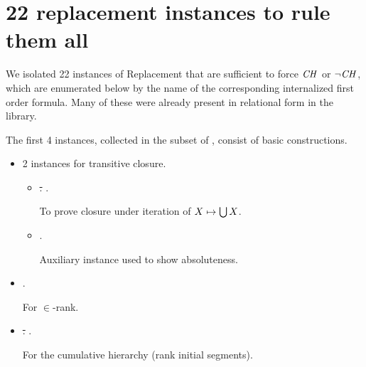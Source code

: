 \section{22 replacement instances to rule them all}
\label{sec:repl-instances-appendix}

We isolated 22 instances of Replacement that are sufficient to force
$\mathit{CH}$ or $\neg\mathit{CH}$, which are enumerated below by the name of the
corresponding internalized first order formula. Many of these were already present in
relational form in the  library.

The first 4 instances, collected in the subset
 of \formula, consist of basic
constructions.

\begin{itemize}
\item 2 instances for transitive closure.
  \begin{itemize}
  \item
    \sout{.} .

    To prove closure under iteration of $X\mapsto\mathop{\textstyle\bigcup} X$.
  \item
    \sout{} .

    Auxiliary instance used to show absoluteness.
  \end{itemize}
\item {}.
  
  For $\in$-rank.
\item \sout{.} .

  For the cumulative hierarchy (rank initial segments).
\end{itemize}

